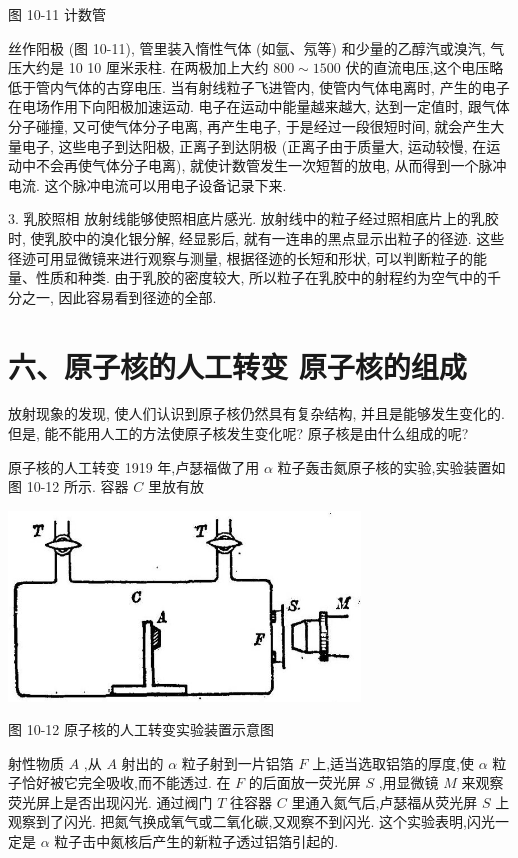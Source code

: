 \documentclass[10pt]{article}
\begin{document}
图 10-11 计数管

丝作阳极 (图 10-11), 管里装入惰性气体 (如氩、氖等) 和少量的乙醇汽或溴汽, 气压大约是 10 10 厘米汞柱. 在两极加上大约 \({800} \sim {1500}\) 伏的直流电压,这个电压略低于管内气体的古穿电压. 当有射线粒子飞进管内, 使管内气体电离时, 产生的电子在电场作用下向阳极加速运动. 电子在运动中能量越来越大, 达到一定值时, 跟气体分子碰撞, 又可使气体分子电离, 再产生电子, 于是经过一段很短时间, 就会产生大量电子, 这些电子到达阳极, 正离子到达阴极 (正离子由于质量大, 运动较慢, 在运动中不会再使气体分子电离), 就使计数管发生一次短暂的放电, 从而得到一个脉冲电流. 这个脉冲电流可以用电子设备记录下来.

3. 乳胶照相 放射线能够使照相底片感光. 放射线中的粒子经过照相底片上的乳胶时, 使乳胶中的溴化银分解, 经显影后, 就有一连串的黑点显示出粒子的径迹. 这些径迹可用显微镜来进行观察与测量, 根据径迹的长短和形状, 可以判断粒子的能量、性质和种类. 由于乳胶的密度较大, 所以粒子在乳胶中的射程约为空气中的千分之一, 因此容易看到径迹的全部.

\section*{六、原子核的人工转变 原子核的组成}

放射现象的发现, 使人们认识到原子核仍然具有复杂结构, 并且是能够发生变化的. 但是, 能不能用人工的方法使原子核发生变化呢? 原子核是由什么组成的呢?

原子核的人工转变 1919 年,卢瑟福做了用 \(\alpha\) 粒子轰击氮原子核的实验,实验装置如图 10-12 所示. 容器 \(C\) 里放有放

\begin{center}
\includegraphics[max width=0.7\textwidth]{images/01913056-1f15-74d8-9184-9aab52c9d66b_348_790379.jpg}
\end{center}

图 10-12 原子核的人工转变实验装置示意图

射性物质 \(A\) ,从 \(A\) 射出的 \(\alpha\) 粒子射到一片铝箔 \(F\) 上,适当选取铝箔的厚度,使 \(\alpha\) 粒子恰好被它完全吸收,而不能透过. 在 \(F\) 的后面放一荧光屏 \(S\) ,用显微镜 \(M\) 来观察荧光屏上是否出现闪光. 通过阀门 \(T\) 往容器 \(C\) 里通入氮气后,卢瑟福从荧光屏 \(S\) 上观察到了闪光. 把氮气换成氧气或二氧化碳,又观察不到闪光. 这个实验表明,闪光一定是 \(\alpha\) 粒子击中氮核后产生的新粒子透过铝箔引起的.
\end{document}
